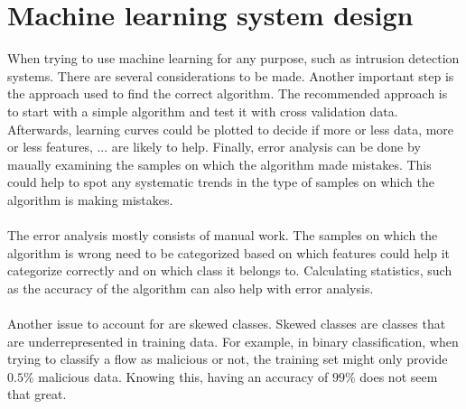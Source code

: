 \section{Machine learning system design}
When trying to use machine learning for any purpose, such as intrusion detection systems. There are several considerations to be made. Another important step is the approach used to find the correct algorithm. 
The recommended approach is to start with a simple algorithm and test it with cross validation data. Afterwards, learning curves could be plotted to decide if more or less data, more or less features, ... are likely to help. Finally, error analysis can be done by maually examining the samples on which the algorithm made mistakes. This could help to spot any systematic trends in the type of samples on which the algorithm is making mistakes.\\\\
The error analysis mostly consists of manual work. The samples on which the algorithm is wrong need to be categorized based on which features could help it categorize correctly and on which class it belongs to. Calculating statistics, such as the accuracy of the algorithm can also help with error analysis. \\\\
Another issue to account for are skewed classes. Skewed classes are classes that are underrepresented in training data. For example, in binary classification, when trying to classify a flow as malicious or not, the training set might only provide $0.5$\% malicious data. Knowing this, having an accuracy of $99$\% does not seem that great.

